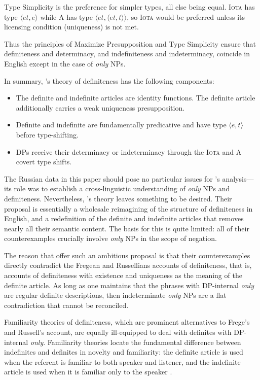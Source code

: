 Type Simplicity is the preference for simpler types, all else being equal. \textsc{Iota} has type $\langle et, e \rangle$ while \textsc{A} has type $\langle et, \langle et, t \rangle \rangle$, so \textsc{Iota} would be preferred unless its licensing condition (uniqueness) is not met.

Thus the principles of Maximize Presupposition and Type Simplicity ensure that definiteness and determinacy, and indefiniteness and indeterminacy, coincide in English except in the case of \textit{only} NPs.

In summary, \citeauthor{cb2015}'s theory of definiteness has the following components:

\begin{itemize}
	\item The definite and indefinite articles are identity functions. The definite article additionally carries a weak uniqueness presupposition.
	\item Definite and indefinite are fundamentally predicative and have type $\langle e, t \rangle$ before type-shifting.
	\item DPs receive their determinacy or indeterminacy through the \textsc{Iota} and \textsc{A} covert type shifts.
\end{itemize}

The Russian data in this paper should pose no particular issues for \citeauthor{cb2015}'s analysis---its role was to establish a cross-linguistic understanding of \textit{only} NPs and definiteness. Nevertheless, \citeauthor{cb2015}'s theory leaves something to be desired. Their proposal is essentially a wholesale reimagining of the structure of definiteness in English, and a redefinition of the definite and indefinite articles that removes nearly all their semantic content. The basis for this is quite limited: all of their counterexamples crucially involve \textit{only} NPs in the scope of negation.

The reason that \citeauthor{cb2015} offer such an ambitious proposal is that their counterexamples directly contradict the Fregean and Russellians accounts of definiteness, that is, accounts of definiteness with existence and uniqueness as the meaning of the definite article. As long as one maintains that the phrases with DP-internal \textit{only} are regular definite descriptions, then indeterminate \textit{only} NPs are a flat contradiction that cannot be reconciled.

Familiarity theories of definiteness, which are prominent alternatives to Frege's and Russell's account, are equally ill-equipped to deal with definites with DP-internal \textit{only}. Familiarity theories locate the fundamental difference between indefinites and definites in novelty and familiarity: the definite article is used when the referent is familiar to both speaker and listener, and the indefinite article is used when it is familiar only to the speaker \citep{heim82}.

